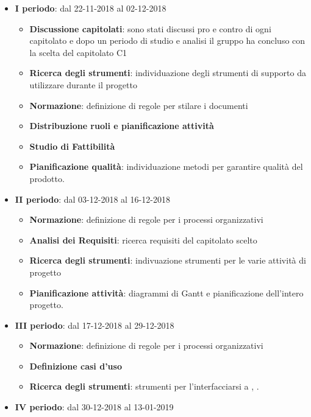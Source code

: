 		\begin{itemize}
			\item \textbf{I periodo}: dal 22-11-2018 al 02-12-2018
			\begin{itemize}
    	        \item \textbf{Discussione capitolati}: sono stati discussi pro e contro di ogni capitolato e dopo un periodo di
    	        studio e analisi il gruppo ha concluso con la scelta del capitolato C1 
    	        \item \textbf{Ricerca degli strumenti}: individuazione degli strumenti di supporto da utilizzare durante il progetto
    	        \item \textbf{Normazione}: definizione di regole per stilare i documenti
    	        \item \textbf{Distribuzione ruoli e pianificazione attività}
       	        \item \textbf{Studio di Fattibilità}
       	        \item \textbf{Pianificazione qualità}: individuazione metodi per garantire qualità del prodotto.
        	\end{itemize}
			\item \textbf{II periodo}: dal 03-12-2018 al 16-12-2018
			\begin{itemize}
    	        \item \textbf{Normazione}: definizione di regole per i processi organizzativi
    	        \item \textbf{Analisi dei Requisiti}: ricerca requisiti del capitolato scelto
       	        \item \textbf{Ricerca degli strumenti}: indivuazione strumenti per le varie attività di progetto
       	        \item \textbf{Pianificazione attività}: diagrammi di Gantt e pianificazione dell'intero progetto.
        	\end{itemize}
        	\item \textbf{III periodo}: dal 17-12-2018 al 29-12-2018
			\begin{itemize}
    	        \item \textbf{Normazione}: definizione di regole per i processi organizzativi
    	        \item \textbf{Definizione casi d'uso}
       	        \item \textbf{Ricerca degli strumenti}: strumenti per l'interfacciarsi a , .
        	\end{itemize}
        	\item \textbf{IV periodo}: dal 30-12-2018 al 13-01-2019

\end{itemize}
